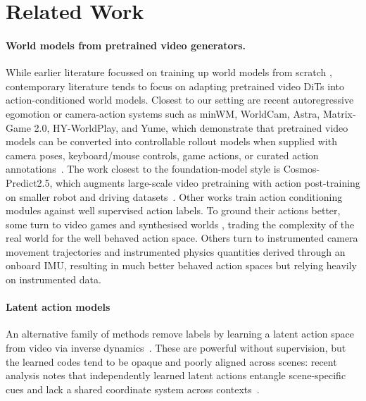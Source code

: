 \documentclass[letterpaper]{article} %
\begin{document}
\section{Related Work}

\paragraph{World models from pretrained video generators.}
While earlier literature focussed on training up world models from scratch \cite{mineworld, navwormod}, contemporary literature tends to focus on adapting pretrained video DiTs \cite{wan2025, cogvid, skyreels} into action-conditioned world models. Closest to our setting are recent autoregressive egomotion or camera-action systems such as minWM, WorldCam, Astra, Matrix-Game 2.0, HY-WorldPlay, and Yume, which demonstrate that pretrained video models can be converted into controllable rollout models when supplied with camera poses, keyboard/mouse controls, game actions, or curated action annotations~\cite{minwm, worldcam, astra, matrixgame2, hyworldplay, yume}. The work closest to the foundation-model style is Cosmos-Predict2.5, which augments large-scale video pretraining with action post-training on smaller robot and driving datasets~\cite{cosmos}. Other works \cite{dws, vid2world} train action conditioning modules against well supervised action labels. To ground their actions better, some turn to video games and synthesised worlds \cite{gamefactory, matrixgame2}, trading the complexity of the real world for the well behaved action space. Others turn to instrumented camera movement trajectories \cite{cameracontrol2} and instrumented physics quantities \cite{aeroworld} derived through an onboard IMU, resulting in much better behaved action spaces but relying heavily on instrumented data.

\paragraph{Latent action models}
An alternative family of methods remove labels by learning a latent action space from video via inverse dynamics~\cite{genie, lapo, lapa, adaworld}. These are powerful without supervision, but the learned codes tend to be opaque and poorly aligned across scenes: recent analysis notes that independently learned latent actions entangle scene-specific cues and lack a shared coordinate system across contexts~\cite{olafworld}.
\end{document}
